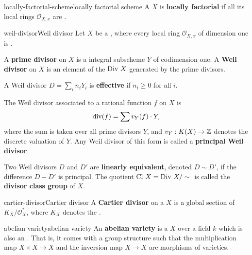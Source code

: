 \begin{topic}{locally-factorial-scheme}{locally factorial scheme}
    A  $X$ is \textbf{locally factorial} if all its local rings $\mathcal{O}_{X,x}$ are .
\end{topic}

\begin{topic}{weil-divisor}{Weil divisor}
    Let $X$ be a    , where every local ring $\mathcal{O}_{X,x}$ of dimension one is .
    
    A \textbf{prime divisor} on $X$ is a  integral subscheme $Y$ of codimension one. A \textbf{Weil divisor} on $X$ is an element of the  $\textup{Div } X$ generated by the prime divisors.
    
    A Weil divisor $D = \sum_i n_i Y_i$ is \textbf{effective} if $n_i \ge 0$ for all $i$.
    
    The Weil divisor associated to a rational function $f$ on $X$ is
    \[ \textup{div}(f) = \sum v_Y(f) \cdot Y , \]
    where the sum is taken over all prime divisors $Y$, and $v_Y : K(X) \to \mathbb{Z}$ denotes the discrete valuation of $Y$. Any Weil divisor of this form is called a \textbf{principal Weil divisor}.
    
    Two Weil divisors $D$ and $D'$ are \textbf{linearly equivalent}, denoted $D \sim{} D'$, if the difference $D - D'$ is principal. The quotient $\textup{Cl } X = \textup{Div } X / \sim{}$ is called the \textbf{divisor class group} of $X$.
\end{topic}

\begin{topic}{cartier-divisor}{Cartier divisor}
    A \textbf{Cartier divisor} on a  $X$ is a global section of $K_X / \mathcal{O}_X^*$, where $K_X$ denotes the .
\end{topic}

\begin{topic}{abelian-variety}{abelian variety}
    An \textbf{abelian variety} is a   $X$ over a field $k$ which is also an . That is, it comes with a group structure such that the multiplication map $X \times X \to X$ and the inversion map $X \to X$ are morphisms of varieties.
\end{topic}

